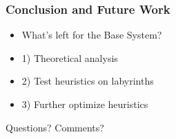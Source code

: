 \documentclass{beamer}
\begin{document}
\begin{frame}
\frametitle{Conclusion and Future Work}
\begin{itemize}

\item What's left for the Base System?
\item[] 1) Theoretical analysis

\item[] 2) Test heuristics on labyrinths

\item[] 3) Further optimize heuristics


\end{itemize}
\end{frame}


\begin{frame}
\Huge{\centerline{Questions? Comments?}}
\end{frame}





\end{document}
